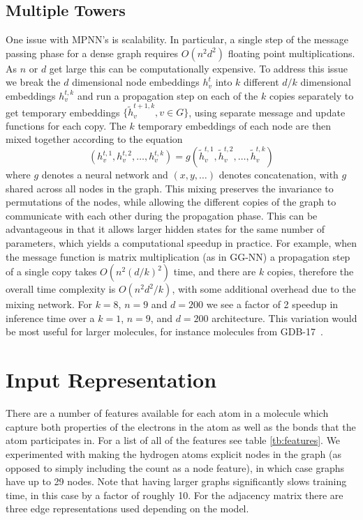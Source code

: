 \documentclass{article}
\begin{document}
\subsection{Multiple Towers} \label{subsec:towers}
   One issue with MPNN’s is scalability. In particular, a single step of the message passing phase for a dense graph requires $O( n^2 d^2)$ floating point multiplications. As $n$ or $d$ get large this can be computationally expensive. To address this issue we break the $d$ dimensional node embeddings $h_v^t$ into $k$ different $d/k$ dimensional embeddings $h_v^{t,k}$ and run a propagation step on each of the $k$ copies separately to get temporary embeddings $\{ \tilde{h}_v^{t+1,k}, v \in G\}$, using separate message and update functions for each copy. The $k$ temporary embeddings of each node are then mixed together according to the equation
 \begin{equation}
  \left(h_v^{t, 1}, h_v^{t, 2},\ldots, h_v^{t, k}\right) = g\left(\tilde{h}_v^{t, 1}, \tilde{h}_v^{t, 2}, \ldots , \tilde{h}_v^{t, k}\right)
\end{equation}
 where $g$ denotes a neural network and $(x, y, \ldots)$ denotes concatenation, with $g$ shared across all nodes in the graph. This mixing preserves the invariance to permutations of the nodes, while allowing the different copies of the graph to communicate with each other during the propagation phase. This can be advantageous in that it allows larger hidden states for the same number of parameters, which yields a computational speedup in practice. For example, when the message function is matrix multiplication (as in GG-NN) a propagation step of a single copy takes $O\left( n^2 (d/k)^2 \right)$ time, and there are $k$ copies, therefore the overall time complexity is $O \left(n^2 d^2 / k \right)$, with some additional overhead due to the mixing network. For $k=8$, $n=9$ and $d=200$ we see a factor of 2 speedup in inference time over a $k=1$, $n=9$, and $d=200$ architecture. This variation would be most useful for larger molecules, for instance molecules from GDB-17~\citep{ruddigkeit2012enumeration}.
   


\section{Input Representation} \label{subsec:input}
There are a number of features available for each atom in a molecule which capture both properties of the electrons in the atom as well as the bonds that the atom participates in. For a list of all of the features see table \ref{tb:features}. We experimented with making the hydrogen atoms explicit nodes in the graph (as opposed to simply including the count as a node feature), in which case graphs have up to 29 nodes. Note that having larger graphs significantly slows training time, in this case by a factor of roughly 10. For the adjacency matrix there are three edge representations used depending on the model. 
\end{document}
